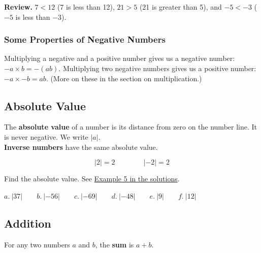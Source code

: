 \documentclass[letter]{article}
\newenvironment{keybox}
  {\begin{lrbox}{\keyboxsave}\begin{minipage}{\dimexpr\linewidth-2\fboxsep-2\fboxrule\relax}}
  {\end{minipage}\end{lrbox}\par\noindent\fbox{\usebox{\keyboxsave}}\par}
\newcommand{\exbox}[1]{\fbox{\textbf{Example #1}}}
\newcommand{\chp}{}
\newcommand{\seesol}[1]{See \hyperref[sec:\chp ex#1]{Example #1 in the solutions}.}
\begin{document}
\textbf{Review.} $7<12$ (7 is less than 12), $21>5$ (21 is greater than 5), and $-5<-3$ ($-5$ is less than $-3$).

\subsubsection*{Some Properties of Negative Numbers}

Multiplying a negative and a positive number gives us a negative number: $-a\times b=-(ab)$. Multiplying two negative numbers gives us a positive number: $-a\times-b=ab$. (More on these in the section on multiplication.)

\subsection{Absolute Value}

\begin{keybox}
The \textbf{absolute value} of a number is its distance from zero on the number line. It is never negative. We write $|a|$.\\
\textbf{Inverse numbers} have the same absolute value.
\end{keybox}

\begin{center}
\end{center}
\[|2|=2\qquad\qquad|-2|=2\]

\exbox{5} Find the absolute value. \seesol{5}
\begin{center}
$a.\ |37|\qquad b.\ |-56|\qquad c.\ |-69|\qquad d.\ |-48|\qquad e.\ |9|\qquad f.\ |12|$
\end{center}

\subsection{Addition}

For any two numbers $a$ and $b$, the \textbf{sum} is $a+b$.
\end{document}

